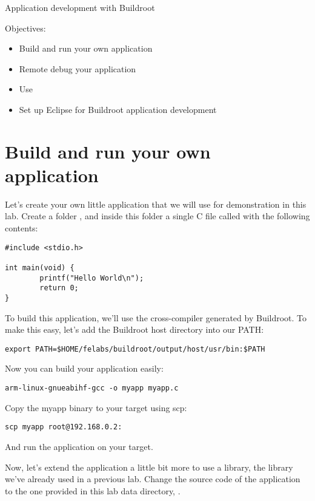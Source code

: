 \subchapter
{Application development with Buildroot}
{Objectives:
  \begin{itemize}
  \item Build and run your own application
  \item Remote debug your application
  \item Use 
  \item Set up Eclipse for Buildroot application development
  \end{itemize}
}

\section{Build and run your own application}

Let's create your own little application that we will use for
demonstration in this lab. Create a folder ,
and inside this folder a single C file called  with the
following contents:

\begin{verbatim}
#include <stdio.h>

int main(void) {
        printf("Hello World\n");
        return 0;
}
\end{verbatim}

To build this application, we'll use the cross-compiler generated by
Buildroot. To make this easy, let's add the Buildroot host directory
into our PATH:

\begin{verbatim}
export PATH=$HOME/felabs/buildroot/output/host/usr/bin:$PATH
\end{verbatim}

Now you can build your application easily:

\begin{verbatim}
arm-linux-gnueabihf-gcc -o myapp myapp.c
\end{verbatim}

Copy the myapp binary to your target using scp:

\begin{verbatim}
scp myapp root@192.168.0.2:
\end{verbatim}

And run the  application on your target.

Now, let's extend the application a little bit more to use a library,
the  library we've already used in a previous
lab. Change the source code of the application to the one provided in
this lab data directory, .

